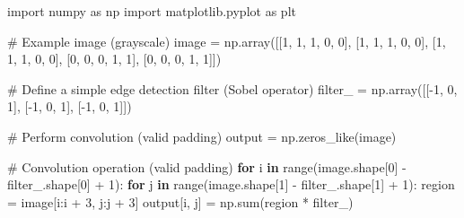 \documentclass[
  letterpaper,
  DIV=11,
  numbers=noendperiod]{scrreprt}
\newenvironment{Shaded}{\begin{snugshade}}{\end{snugshade}}
\newcommand{\BuiltInTok}[1]{\textcolor[rgb]{0.00,0.23,0.31}{#1}}
\newcommand{\CommentTok}[1]{\textcolor[rgb]{0.37,0.37,0.37}{#1}}
\newcommand{\ControlFlowTok}[1]{\textcolor[rgb]{0.00,0.23,0.31}{\textbf{#1}}}
\newcommand{\DecValTok}[1]{\textcolor[rgb]{0.68,0.00,0.00}{#1}}
\newcommand{\ImportTok}[1]{\textcolor[rgb]{0.00,0.46,0.62}{#1}}
\newcommand{\KeywordTok}[1]{\textcolor[rgb]{0.00,0.23,0.31}{\textbf{#1}}}
\newcommand{\NormalTok}[1]{\textcolor[rgb]{0.00,0.23,0.31}{#1}}
\newcommand{\OperatorTok}[1]{\textcolor[rgb]{0.37,0.37,0.37}{#1}}
\begin{document}
\begin{Shaded}
\begin{Highlighting}[]
\ImportTok{import}\NormalTok{ numpy }\ImportTok{as}\NormalTok{ np}
\ImportTok{import}\NormalTok{ matplotlib.pyplot }\ImportTok{as}\NormalTok{ plt}

\CommentTok{\# Example image (grayscale)}
\NormalTok{image }\OperatorTok{=}\NormalTok{ np.array([[}\DecValTok{1}\NormalTok{, }\DecValTok{1}\NormalTok{, }\DecValTok{1}\NormalTok{, }\DecValTok{0}\NormalTok{, }\DecValTok{0}\NormalTok{],}
\NormalTok{                  [}\DecValTok{1}\NormalTok{, }\DecValTok{1}\NormalTok{, }\DecValTok{1}\NormalTok{, }\DecValTok{0}\NormalTok{, }\DecValTok{0}\NormalTok{],}
\NormalTok{                  [}\DecValTok{1}\NormalTok{, }\DecValTok{1}\NormalTok{, }\DecValTok{1}\NormalTok{, }\DecValTok{0}\NormalTok{, }\DecValTok{0}\NormalTok{],}
\NormalTok{                  [}\DecValTok{0}\NormalTok{, }\DecValTok{0}\NormalTok{, }\DecValTok{0}\NormalTok{, }\DecValTok{1}\NormalTok{, }\DecValTok{1}\NormalTok{],}
\NormalTok{                  [}\DecValTok{0}\NormalTok{, }\DecValTok{0}\NormalTok{, }\DecValTok{0}\NormalTok{, }\DecValTok{1}\NormalTok{, }\DecValTok{1}\NormalTok{]])}

\CommentTok{\# Define a simple edge detection filter (Sobel operator)}
\NormalTok{filter\_ }\OperatorTok{=}\NormalTok{ np.array([[}\OperatorTok{{-}}\DecValTok{1}\NormalTok{, }\DecValTok{0}\NormalTok{, }\DecValTok{1}\NormalTok{],}
\NormalTok{                    [}\OperatorTok{{-}}\DecValTok{1}\NormalTok{, }\DecValTok{0}\NormalTok{, }\DecValTok{1}\NormalTok{],}
\NormalTok{                    [}\OperatorTok{{-}}\DecValTok{1}\NormalTok{, }\DecValTok{0}\NormalTok{, }\DecValTok{1}\NormalTok{]])}

\CommentTok{\# Perform convolution (valid padding)}
\NormalTok{output }\OperatorTok{=}\NormalTok{ np.zeros\_like(image)}

\CommentTok{\# Convolution operation (valid padding)}
\ControlFlowTok{for}\NormalTok{ i }\KeywordTok{in} \BuiltInTok{range}\NormalTok{(image.shape[}\DecValTok{0}\NormalTok{] }\OperatorTok{{-}}\NormalTok{ filter\_.shape[}\DecValTok{0}\NormalTok{] }\OperatorTok{+} \DecValTok{1}\NormalTok{):}
    \ControlFlowTok{for}\NormalTok{ j }\KeywordTok{in} \BuiltInTok{range}\NormalTok{(image.shape[}\DecValTok{1}\NormalTok{] }\OperatorTok{{-}}\NormalTok{ filter\_.shape[}\DecValTok{1}\NormalTok{] }\OperatorTok{+} \DecValTok{1}\NormalTok{):}
\NormalTok{        region }\OperatorTok{=}\NormalTok{ image[i:i }\OperatorTok{+} \DecValTok{3}\NormalTok{, j:j }\OperatorTok{+} \DecValTok{3}\NormalTok{]}
\NormalTok{        output[i, j] }\OperatorTok{=}\NormalTok{ np.}\BuiltInTok{sum}\NormalTok{(region }\OperatorTok{*}\NormalTok{ filter\_)}


\end{Highlighting}
\end{Shaded}
\end{document}
